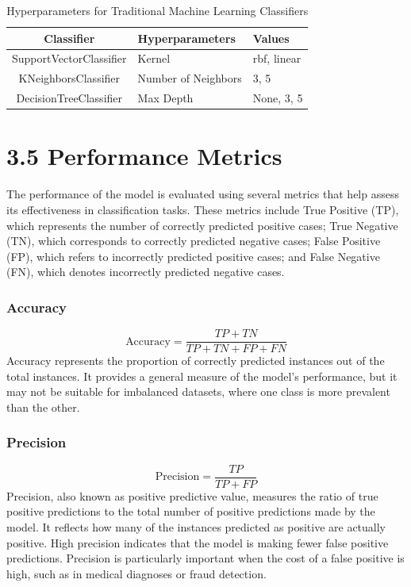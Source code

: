 \documentclass[12pt,a4paper]{report}
\begin{document}
	
\begin{table}[h]
	\renewcommand\thetable{3.3}
	\centering
	\caption{Hyperparameters for Traditional Machine Learning Classifiers}
	\renewcommand{\arraystretch}{2.5} %
	\begin{tabular}{|c|l|l|}
		\hline
		\textbf{Classifier} & \textbf{Hyperparameters} & \textbf{Values} \\ \hline
		SupportVectorClassifier & Kernel & rbf, linear \\ \hline
		KNeighborsClassifier & Number of Neighbors & 3, 5 \\ \hline
		DecisionTreeClassifier & Max Depth & None, 3, 5 \\ \hline
		
	\end{tabular}
	\label{tab:hyperparameters_classifiers}
\end{table}



\section*{3.5 Performance Metrics}

\hspace{1cm}The performance of the model is evaluated using several metrics that help assess its effectiveness in classification tasks. These metrics include True Positive (TP), which represents the number of correctly predicted positive cases; True Negative (TN), which corresponds to correctly predicted negative cases; False Positive (FP), which refers to incorrectly predicted positive cases; and False Negative (FN), which denotes incorrectly predicted negative cases.

\subsubsection*{ Accuracy}
\[
\text{Accuracy} = \frac{TP + TN}{TP + TN + FP + FN}
\]
Accuracy represents the proportion of correctly predicted instances out of the total instances. It provides a general measure of the model’s performance, but it may not be suitable for imbalanced datasets, where one class is more prevalent than the other.

\subsubsection*{ Precision}
\[
\text{Precision} = \frac{TP}{TP + FP}
\]
Precision, also known as positive predictive value, measures the ratio of true positive predictions to the total number of positive predictions made by the model. It reflects how many of the instances predicted as positive are actually positive. High precision indicates that the model is making fewer false positive predictions. Precision is particularly important when the cost of a false positive is high, such as in medical diagnoses or fraud detection.
\end{document}
